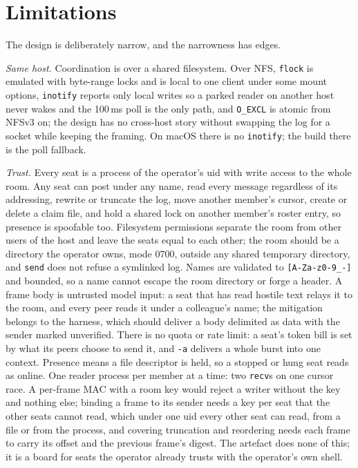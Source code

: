 \documentclass[11pt]{article}
\newcommand{\code}[1]{\texttt{#1}}
\begin{document}
\section{Limitations}

The design is deliberately narrow, and the narrowness has edges.

\emph{Same host.} Coordination is over a shared filesystem. Over NFS, \code{flock} is emulated with byte-range locks and is local to one client under some mount options, \code{inotify} reports only local writes so a parked reader on another host never wakes and the 100\,ms poll is the only path, and \code{O\_EXCL} is atomic from NFSv3 on; the design has no cross-host story without swapping the log for a socket while keeping the framing. On macOS there is no \code{inotify}; the build there is the poll fallback.

\emph{Trust.} Every seat is a process of the operator's uid with write access to the whole room. Any seat can post under any name, read every message regardless of its addressing, rewrite or truncate the log, move another member's cursor, create or delete a claim file, and hold a shared lock on another member's roster entry, so presence is spoofable too. Filesystem permissions separate the room from other users of the host and leave the seats equal to each other; the room should be a directory the operator owns, mode 0700, outside any shared temporary directory, and \code{send} does not refuse a symlinked log. Names are validated to \code{[A-Za-z0-9\_-]} and bounded, so a name cannot escape the room directory or forge a header. A frame body is untrusted model input: a seat that has read hostile text relays it to the room, and every peer reads it under a colleague's name; the mitigation belongs to the harness, which should deliver a body delimited as data with the sender marked unverified. There is no quota or rate limit: a seat's token bill is set by what its peers choose to send it, and \code{-a} delivers a whole burst into one context. Presence means a file descriptor is held, so a stopped or hung seat reads as online. One reader process per member at a time: two \code{recv}s on one cursor race. A per-frame MAC with a room key would reject a writer without the key and nothing else; binding a frame to its sender needs a key per seat that the other seats cannot read, which under one uid every other seat can read, from a file or from the process, and covering truncation and reordering needs each frame to carry its offset and the previous frame's digest. The artefact does none of this; it is a board for seats the operator already trusts with the operator's own shell.
\end{document}
